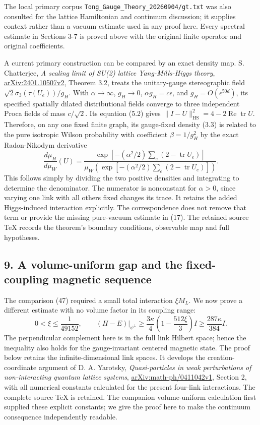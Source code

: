 \documentclass[
  11pt,
]{article}
\begin{document}
The local primary corpus \texttt{Tong\_Gauge\_Theory\_20260904/gt.txt}
was also consulted for the lattice Hamiltonian and continuum discussion;
it supplies context rather than a vacuum estimate used in any proof
here. Every spectral estimate in Sections 3-7 is proved above with the
original finite operator and original coefficients.

A current primary construction can be compared by an exact density map.
S. Chatterjee, \emph{A scaling limit of SU(2) lattice Yang-Mills-Higgs
theory}, \href{https://arxiv.org/abs/2401.10507v2}{arXiv:2401.10507v2},
Theorem 3.2, treats the unitary-gauge stereographic field
\(\sqrt2\sigma_3(\tau(U_e))/g_H\). With \(\alpha\to\infty\),
\(g_H\to0\), \(\alpha g_H=c\epsilon\), and \(g_H=O(\epsilon^{50d})\),
its specified spatially dilated distributional fields converge to three
independent Proca fields of mass \(c/\sqrt2\). Its equation (5.2) gives
\(\|I-U\|_{\mathrm{HS}}^2=4-2\operatorname{Re}\operatorname{tr}U\).
Therefore, on any one fixed finite graph, its gauge-fixed density (3.3)
is related to the pure isotropic Wilson probability with coefficient
\(\beta=1/g_H^2\) by the exact Radon-Nikodym derivative \[
 \frac{d\mu_H}{d\mu_W}(U)
 =\frac{\exp[-(\alpha^2/2)\sum_e(2-\operatorname{tr}U_e)]}
 {\mu_W(\exp[-(\alpha^2/2)\sum_e(2-\operatorname{tr}U_e)])}.
\] This follows simply by dividing the two positive densities and
integrating to determine the denominator. The numerator is nonconstant
for \(\alpha>0\), since varying one link with all others fixed changes
its trace. It retains the added Higgs-induced interaction explicitly.
The correspondence does not remove that term or provide the missing
pure-vacuum estimate in (17). The retained source TeX records the
theorem's boundary conditions, observable map and full hypotheses.

\subsection{9. A volume-uniform gap and the fixed-coupling magnetic
sequence}\label{a-volume-uniform-gap-and-the-fixed-coupling-magnetic-sequence}

The comparison (47) required a small total interaction \(\xi M_L\). We
now prove a different estimate with no volume factor in its coupling
range: \[
 0<\xi\le\frac1{49152},\qquad
 (H-E)|_{\psi^\perp}\ge
 \frac{3\kappa}{4}\left(1-\frac{512\xi}{3}\right)I
 \ge\frac{287\kappa}{384}I .
 \tag{62}
\] The perpendicular complement here is in the full link Hilbert space;
hence the inequality also holds for the gauge-invariant centered
magnetic state. The proof below retains the infinite-dimensional link
spaces. It develops the creation-coordinate argument of D. A. Yarotsky,
\emph{Quasi-particles in weak perturbations of non-interacting quantum
lattice systems},
\href{https://arxiv.org/abs/math-ph/0411042v1}{arXiv:math-ph/0411042v1},
Section 2, with all numerical constants calculated for the present
four-link interactions. The complete source TeX is retained. The
companion volume-uniform calculation first supplied these explicit
constants; we give the proof here to make the continuum consequence
independently readable.
\end{document}
